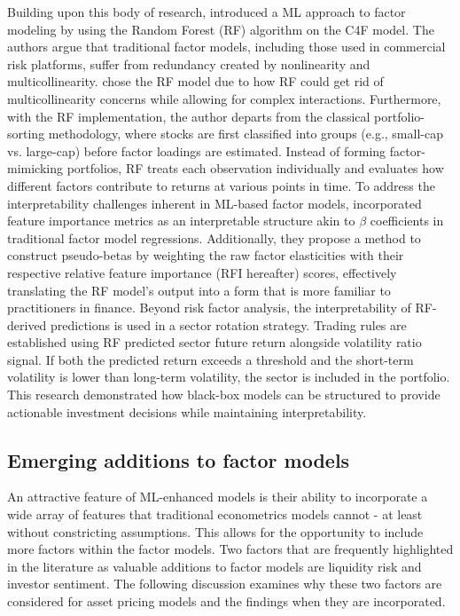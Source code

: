 Building upon this body of research,  introduced a ML approach to factor modeling by using the Random Forest (RF) algorithm on the C4F model. The authors argue that traditional factor models, including those used in commercial risk platforms, suffer from redundancy created by nonlinearity and multicollinearity.  chose the RF model due to how RF could get rid of multicollinearity concerns while allowing for complex interactions. Furthermore, with the RF implementation, the author departs from the classical portfolio-sorting methodology, where stocks are first classified into groups (e.g., small-cap vs. large-cap) before factor loadings are estimated. Instead of forming factor-mimicking portfolios, RF treats each observation individually and evaluates how different factors contribute to returns at various points in time. To address the interpretability challenges inherent in ML-based factor models,  incorporated feature importance metrics as an interpretable structure akin to $\beta$ coefficients in traditional factor model regressions. Additionally, they propose a method to construct pseudo-betas by weighting the raw factor elasticities with their respective relative feature importance (RFI hereafter) scores, effectively translating the RF model's output into a form that is more familiar to practitioners in finance. Beyond risk factor analysis, the interpretability of RF-derived predictions is used in a sector rotation strategy. Trading rules are established using RF predicted sector future return alongside volatility ratio signal. If both the predicted return exceeds a threshold and the short-term volatility is lower than long-term volatility, the sector is included in the portfolio. This research demonstrated how black-box models can be structured to provide actionable investment decisions while maintaining interpretability.

\subsection{Emerging additions to factor models}
An attractive feature of ML-enhanced models is their ability to incorporate a wide array of features that traditional econometrics models cannot - at least without constricting assumptions. This allows for the opportunity to include more factors within the factor models. Two factors that are frequently highlighted in the literature as valuable additions to factor models are liquidity risk and investor sentiment. The following discussion examines why these two factors are considered for asset pricing models and the findings when they are incorporated.

